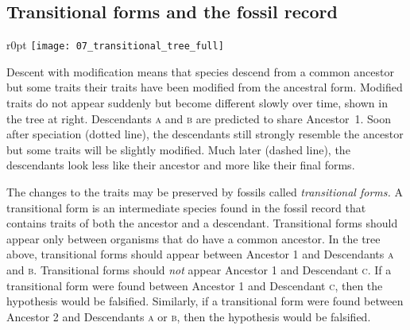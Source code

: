 \documentclass[12pt, hidelinks]{exam}
\newcommand{\hidepoints}{%
	\pointsinmargin\pointformat{}
}
\begin{document}
\subsection*{Transitional forms and the fossil record}%

\hidepoints

\begin{wrapfigure}[12]{r}{0pt}
	\texttt{[image: 07\_transitional\_tree\_full]}
\end{wrapfigure}Descent with modification means that species descend from a common ancestor but some traits their traits have been modified from the ancestral form. Modified traits do not appear suddenly but become different slowly over time, shown in the tree at right. Descendants \textsc{a} and \textsc{b} are predicted to share Ancestor~1. Soon after speciation (dotted line), the descendants still strongly resemble the ancestor but some traits will be slightly modified. Much later (dashed line), the descendants look less like their ancestor and more like their final forms. 

The changes to the traits may be preserved by fossils called \textit{transitional forms.} A transitional form is an intermediate species found in the fossil record that contains traits of both the ancestor and a descendant. Transitional forms should appear only between organisms that do have a common ancestor.  In the tree above, transitional forms should appear between Ancestor 1 and Descendants \textsc{a} and \textsc{b}. Transitional forms should \textit{not} appear Ancestor 1 and Descendant \textsc{c}.  If a transitional form were found between Ancestor 1 and Descendant \textsc{c}, then the hypothesis would be falsified. Similarly, if a transitional form were found between Ancestor 2 and Descendants \textsc{a} or \textsc{b}, then the hypothesis would be falsified.
\end{document}
